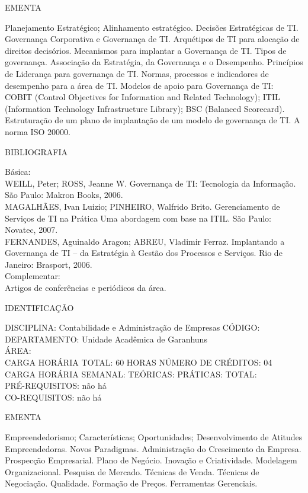\documentclass[
	12pt,				%
	openright,			%
  oneside,     %
	a4paper,			%
	english,			%
	french,				%
	spanish,			%
	brazil				%
	]{abntex2}
\begin{document}
\begin{apendicesenv}
EMENTA 

Planejamento Estratégico; Alinhamento estratégico. Decisões Estratégicas
de TI. Governança Corporativa e Governança de TI. Arquétipos de TI para
alocação de direitos decisórios. Mecanismos para implantar a Governança
de TI. Tipos de governança. Associação da Estratégia, da Governança e o
Desempenho. Princípios de Liderança para governança de TI. Normas,
processos e indicadores de desempenho para a área de TI. Modelos de
apoio para Governança de TI: COBIT (Control Objectives for Information
and Related Technology); ITIL (Information Technology Infrastructure
Library); BSC (Balanced Scorecard). Estruturação de um plano de
implantação de um modelo de governança de TI. A norma ISO 20000.

BIBLIOGRAFIA 

Básica:\\
WEILL, Peter; ROSS, Jeanne W. Governança de TI: Tecnologia da
Informação. São Paulo: Makron Books, 2006.\\
MAGALHÃES, Ivan Luizio; PINHEIRO, Walfrido Brito. Gerenciamento de
Serviços de TI na Prática  Uma abordagem com base na ITIL. São
Paulo: Novatec, 2007.\\
FERNANDES, Aguinaldo Aragon; ABREU, Vladimir Ferraz. Implantando a
Governança de TI -- da Estratégia à Gestão dos Processos e Serviços.
Rio de Janeiro: Brasport, 2006.\\
Complementar:\\
Artigos de conferências e periódicos da área.

\newpage IDENTIFICAÇÃO

DISCIPLINA: Contabilidade e Administração de Empresas CÓDIGO:\\ 
DEPARTAMENTO: Unidade Acadêmica de Garanhuns\\
ÁREA: \\
CARGA HORÁRIA TOTAL: 60 HORAS NÚMERO DE CRÉDITOS: 04\\
CARGA HORÁRIA SEMANAL: TEÓRICAS: PRÁTICAS: TOTAL: \\
PRÉ-REQUISITOS: não há\\
CO-REQUISITOS: não há

EMENTA 

Empreendedorismo; Características; Oportunidades; Desenvolvimento de
Atitudes Empreendedoras. Novos Paradigmas. Administração do Crescimento
da Empresa. Prospecção Empresarial. Plano de Negócio. Inovação e
Criatividade. Modelagem Organizacional. Pesquisa de Mercado. Técnicas
de Venda. Técnicas de Negociação. Qualidade. Formação de Preços.
Ferramentas Gerenciais.


\end{apendicesenv}
\end{document}
